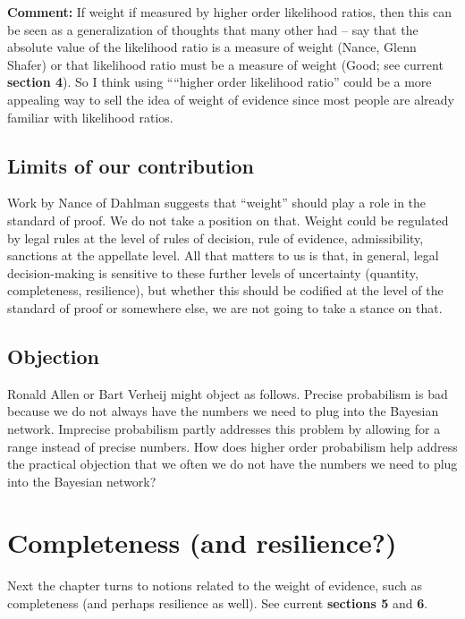 \documentclass[
  10pt,
  dvipsnames,enabledeprecatedfontcommands]{scrartcl}
\begin{document}
\textbf{Comment:} If weight if measured by higher order likelihood
ratios, then this can be seen as a generalization of thoughts that many
other had -- say that the absolute value of the likelihood ratio is a
measure of weight (Nance, Glenn Shafer) or that likelihood ratio must be
a measure of weight (Good; see current \textbf{section 4}). So I think
using ````higher order likelihood ratio'' could be a more appealing way
to sell the idea of weight of evidence since most people are already
familiar with likelihood ratios.

\hypertarget{limits-of-our-contribution}{%
\subsection{Limits of our
contribution}\label{limits-of-our-contribution}}

Work by Nance of Dahlman suggests that ``weight'' should play a role in
the standard of proof. We do not take a position on that. Weight could
be regulated by legal rules at the level of rules of decision, rule of
evidence, admissibility, sanctions at the appellate level. All that
matters to us is that, in general, legal decision-making is sensitive to
these further levels of uncertainty (quantity, completeness,
resilience), but whether this should be codified at the level of the
standard of proof or somewhere else, we are not going to take a stance
on that.

\hypertarget{objection}{%
\subsection{Objection}\label{objection}}

Ronald Allen or Bart Verheij might object as follows. Precise
probabilism is bad because we do not always have the numbers we need to
plug into the Bayesian network. Imprecise probabilism partly addresses
this problem by allowing for a range instead of precise numbers. How
does higher order probabilism help address the practical objection that
we often we do not have the numbers we need to plug into the Bayesian
network?

\hypertarget{completeness-and-resilience-1}{%
\section{Completeness (and
resilience?)}\label{completeness-and-resilience-1}}

Next the chapter turns to notions related to the weight of evidence,
such as completeness (and perhaps resilience as well). See current
\textbf{sections 5} and \textbf{6}.
\end{document}
